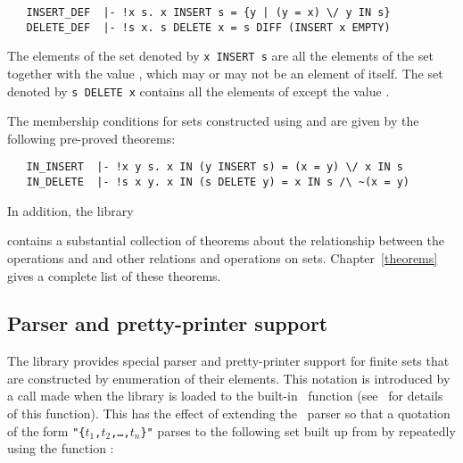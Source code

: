 \begin{hol}
\begin{verbatim}
   INSERT_DEF  |- !x s. x INSERT s = {y | (y = x) \/ y IN s}
   DELETE_DEF  |- !s x. s DELETE x = s DIFF (INSERT x EMPTY)
\end{verbatim}\end{hol}

\noindent The elements of the set denoted by {\small\verb!x INSERT s!} are all
the elements of the set  together with the value , which may or may
not be an element of  itself.  The set denoted by
{\small\verb!s DELETE x!} contains all the elements of 
except the value .

{\samepage The membership conditions for sets constructed using  and
 are given by the following pre-proved theorems:

\begin{hol}
\begin{verbatim}
   IN_INSERT  |- !x y s. x IN (y INSERT s) = (x = y) \/ x IN s
   IN_DELETE  |- !s x y. x IN (s DELETE y) = x IN s /\ ~(x = y)
\end{verbatim}\end{hol}

\noindent In addition, the library} contains a substantial collection of
theorems about the relationship between the operations  and
 and other relations and operations on sets.  Chapter~\ref{theorems}
gives a complete list of these theorems.

\subsection{Parser and pretty-printer support}\label{finite}

The  library provides special parser and pretty-printer support
for finite sets that are constructed by enumeration of their elements. This
notation is introduced by a call made when the library is loaded to the
built-in \ML\ function %
(see~\cite{description} for details of this function).  This has the effect of
extending the \HOL\ parser so that a quotation of the form
{\small\verb!"{!\tt$t_1$,$t_2$,\dots,$t_n$\verb!}"!} parses to the following
set built up from  by repeatedly using the function :

